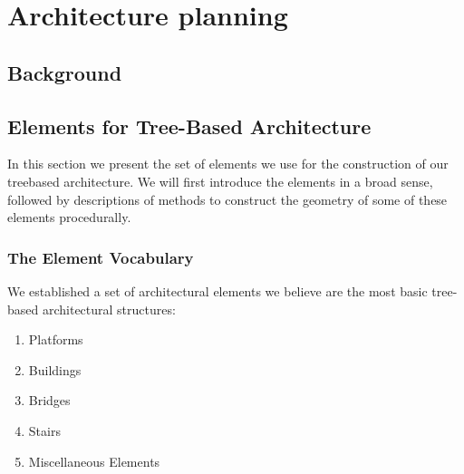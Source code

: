 
\chapter{Architecture planning}
\label{sec:treehousearch}
 
\section{Background}

\section{Elements for Tree-Based Architecture} 
\label{sec:archelements}
 
In this section we present the set of elements we use for the construction of our treebased architecture. We will first introduce the elements in a broad sense, followed by descriptions of methods to construct the geometry of some of these elements procedurally. 
 
\subsection{The Element Vocabulary}
We established a set of architectural elements we believe are the most basic tree-based architectural structures: 

\begin{enumerate}
\item Platforms
\item Buildings
\item Bridges 
\item Stairs
\item Miscellaneous Elements 
\end{enumerate} 

